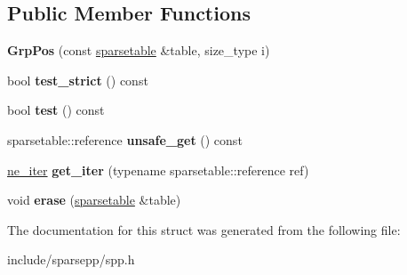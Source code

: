 \subsection*{Public Member Functions}
\begin{DoxyCompactItemize}
\item 
{\bfseries Grp\+Pos} (const \hyperlink{classspp___1_1sparsetable}{sparsetable} \&table, size\+\_\+type i)\hypertarget{structspp___1_1sparsetable_1_1_grp_pos_aac5765944b45dec5eab30f51e41d4d5c}{}\label{structspp___1_1sparsetable_1_1_grp_pos_aac5765944b45dec5eab30f51e41d4d5c}

\item 
bool {\bfseries test\+\_\+strict} () const \hypertarget{structspp___1_1sparsetable_1_1_grp_pos_a0dc0f86f1d132a99499e123f997281b5}{}\label{structspp___1_1sparsetable_1_1_grp_pos_a0dc0f86f1d132a99499e123f997281b5}

\item 
bool {\bfseries test} () const \hypertarget{structspp___1_1sparsetable_1_1_grp_pos_a68f8d68706a81321c6ae5c517fa9a405}{}\label{structspp___1_1sparsetable_1_1_grp_pos_a68f8d68706a81321c6ae5c517fa9a405}

\item 
sparsetable\+::reference {\bfseries unsafe\+\_\+get} () const \hypertarget{structspp___1_1sparsetable_1_1_grp_pos_ad408c566e9bf3a5db2f9699f33b2fadf}{}\label{structspp___1_1sparsetable_1_1_grp_pos_ad408c566e9bf3a5db2f9699f33b2fadf}

\item 
\hyperlink{classspp___1_1_two__d__iterator}{ne\+\_\+iter} {\bfseries get\+\_\+iter} (typename sparsetable\+::reference ref)\hypertarget{structspp___1_1sparsetable_1_1_grp_pos_add826b15c5a158a7aecdb5e6d8045d04}{}\label{structspp___1_1sparsetable_1_1_grp_pos_add826b15c5a158a7aecdb5e6d8045d04}

\item 
void {\bfseries erase} (\hyperlink{classspp___1_1sparsetable}{sparsetable} \&table)\hypertarget{structspp___1_1sparsetable_1_1_grp_pos_a3503ddbe7fe5bbbcb8494998e0e72155}{}\label{structspp___1_1sparsetable_1_1_grp_pos_a3503ddbe7fe5bbbcb8494998e0e72155}

\end{DoxyCompactItemize}


The documentation for this struct was generated from the following file\+:\begin{DoxyCompactItemize}
\item 
include/sparsepp/spp.\+h\end{DoxyCompactItemize}
